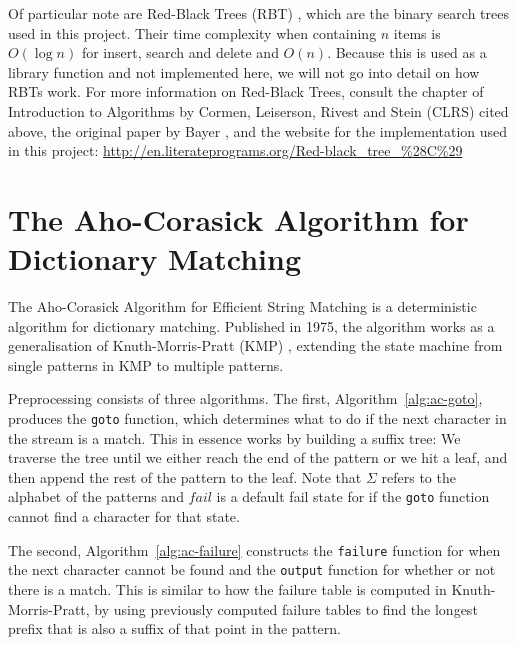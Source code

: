 \documentclass[ %
                    author={Dominic Joseph Moylett},
                    degree={MEng},
                     title={Dictionary Matching with Fingerprints},
                  subtitle={An Empirical Analysis},
                      type={research},
                      year={2015} ]{dissertation}
\begin{document}
Of particular note are Red-Black Trees (RBT) \cite[pp 308-338]{clrs}, which are the binary search trees used in this project. Their time complexity when containing $n$ items is $O(\log n)$ for insert, search and delete and $O(n)$. Because this is used as a library function and not implemented here, we will not go into detail on how RBTs work. For more information on Red-Black Trees, consult the chapter of Introduction to Algorithms by Cormen, Leiserson, Rivest and Stein (CLRS) cited above, the original paper by Bayer \cite{bayer:rbt}, and the website for the implementation used in this project: \url{http://en.literateprograms.org/Red-black_tree_%28C%29}

\section{The Aho-Corasick Algorithm for Dictionary Matching}
\label{sec:aho-corasick}

The Aho-Corasick Algorithm for Efficient String Matching \cite{Aho:1975:ESM:360825.360855} is a deterministic algorithm for dictionary matching. Published in 1975, the algorithm works as a generalisation of Knuth-Morris-Pratt (KMP) \cite{kmp}, extending the state machine from single patterns in KMP to multiple patterns.

Preprocessing consists of three algorithms. The first, Algorithm~\ref{alg:ac-goto}, produces the \texttt{goto} function, which determines what to do if the next character in the stream is a match. This in essence works by building a suffix tree: We traverse the tree until we either reach the end of the pattern or we hit a leaf, and then append the rest of the pattern to the leaf. Note that $\Sigma$ refers to the alphabet of the patterns and $fail$ is a default fail state for if the \texttt{goto} function cannot find a character for that state.

The second, Algorithm~\ref{alg:ac-failure} constructs the \texttt{failure} function for when the next character cannot be found and the \texttt{output} function for whether or not there is a match. This is similar to how the failure table is computed in Knuth-Morris-Pratt, by using previously computed failure tables to find the longest prefix that is also a suffix of that point in the pattern.
\end{document}
